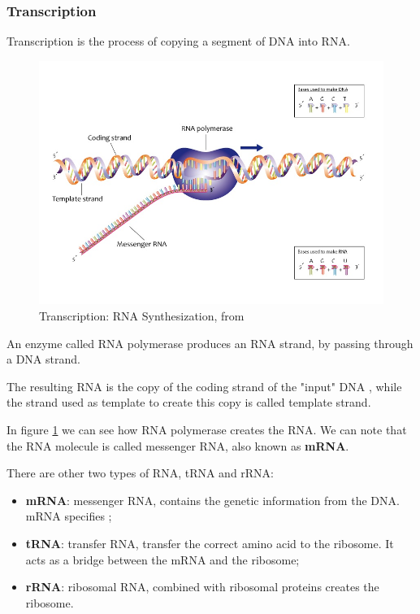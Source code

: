 \subsubsection{Transcription}
Transcription is the process of copying a segment of DNA into RNA.

\begin{figure}[h!]
	\includegraphics[scale=.53]{res/proteins_overview/rna_polymerase.jpeg}
	\centering
	\caption{Transcription: RNA Synthesization, from \cite{transcription}}
	\label{fig:transcription}
\end{figure}

An enzyme called RNA polymerase produces an RNA strand, by passing through a DNA strand. 

The resulting RNA is the copy of the coding strand of the "input" DNA , while the strand used as template to create this copy is called template strand.

In figure \ref{fig:transcription} we can see how RNA polymerase creates the RNA. We can note that the RNA molecule is called messenger RNA, also known as \textbf{mRNA}.

There are other two types of RNA, tRNA and rRNA:
\begin{itemize}
	\item \textbf{mRNA}: messenger RNA, contains the genetic information from the DNA. mRNA specifies ;
	\item \textbf{tRNA}: transfer RNA, transfer the correct amino acid to the ribosome. It acts as a bridge between the mRNA and the ribosome;
	\item \textbf{rRNA}: ribosomal RNA, combined with ribosomal proteins creates the ribosome.
\end{itemize}


